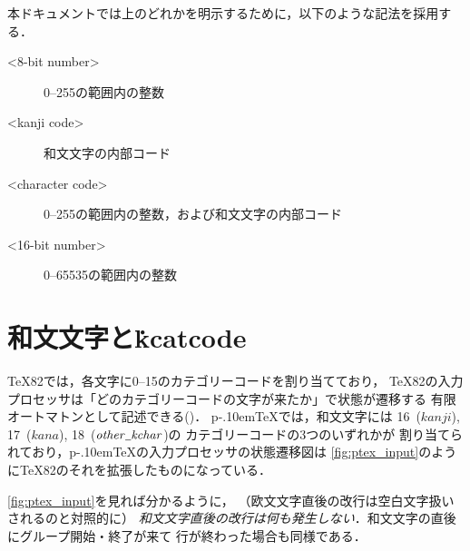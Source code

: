 \documentclass[a4paper,11pt,nomag]{jsarticle}
\def\pTeX{p\kern-.10em\TeX}
\def\_{\leavevmode\vrule width .45em height -.2ex depth .3ex\relax}
\begin{document}
\medskip

本ドキュメントでは上のどれかを明示するために，以下のような記法を採用する．
\begin{description}
 \item[<8-bit number>] 0--255の範囲内の整数
 \item[<kanji code>] 和文文字の内部コード
 \item[<character code>] 0--255の範囲内の整数，および和文文字の内部コード
 \item[<16-bit number>] 0--65535の範囲内の整数
\end{description}

\section{和文文字と\.{kcatcode}}
\TeX82では，各文字に0--15のカテゴリーコードを割り当てており，
\TeX82の入力プロセッサは「どのカテゴリーコードの文字が来たか」で状態が遷移する
有限オートマトンとして記述できる(\cite{topic})．
\pTeX では，和文文字には
16~($\mathit{kanji}$), 17~($\mathit{kana}$), 18~($\mathit{other\_kchar}$)の
カテゴリーコードの3つのいずれかが
割り当てられており，\pTeX の入力プロセッサの状態遷移図は
\autoref{fig:ptex_input}のように\TeX82のそれを拡張したものになっている．

\autoref{fig:ptex_input}を見れば分かるように，
（欧文文字直後の改行は空白文字扱いされるのと対照的に）
\emph{和文文字直後の改行は何も発生しない}．和文文字の直後にグループ開始・終了が来て
行が終わった場合も同様である．
\end{document}

